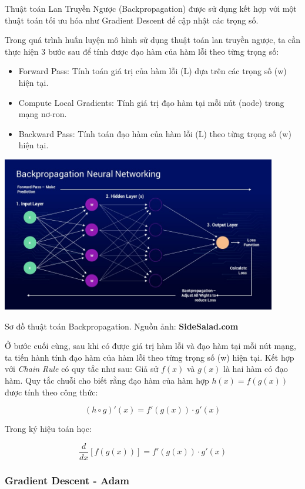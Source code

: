 \documentclass[a4paper, 10pt]{article}
\begin{document}
Thuật toán Lan Truyền Ngược (Backpropagation) được sử dụng kết hợp với
một thuật toán tối ưu hóa như Gradient Descent để cập nhật các trọng số.

Trong quá trình huấn luyện mô hình sử dụng thuật toán lan truyền ngược, ta cần 
thực hiện 3 bước sau để tính được đạo hàm của hàm lỗi theo từng trọng số:
\begin{itemize}
    \item Forward Pass: Tính toán giá trị của hàm lỗi (L) dựa trên các trọng số (w) hiện tại.
    \item Compute Local Gradients: Tính giá trị đạo hàm tại mỗi nút (node) trong mạng nơ-ron.
    \item Backward Pass: Tính toán đạo hàm của hàm lỗi (L) theo từng trọng số (w) hiện tại.
\end{itemize}

\begin{minipage}{\linewidth}
    \captionsetup{type=figure}
    \centering
    \includegraphics[width=12cm]{./back-propagation.jpg}
    \caption{Sơ đồ thuật toán Backpropagation. Nguồn ảnh: \textbf{SideSalad.com}}
\end{minipage}

Ở bước cuối cùng, sau khi có được giá trị hàm lỗi và đạo hàm tại mỗi nút mạng, ta tiến hành tính đạo hàm của hàm lỗi theo từng trọng số (w) hiện tại.
Kết hợp với \textit{Chain Rule} có quy tắc như sau:
Giả sử $f(x)$ và $g(x)$ là hai hàm có đạo hàm. Quy tắc chuỗi cho biết rằng đạo hàm của hàm hợp $h(x) = f(g(x))$ được tính theo công thức:

\[
(h \circ g)'(x) = f'(g(x)) \cdot g'(x)
\]

Trong ký hiệu toán học:

\[
\frac{d}{dx}[f(g(x))] = f'(g(x)) \cdot g'(x)
\]
\subsubsection{Gradient Descent - Adam} 
\end{document}
